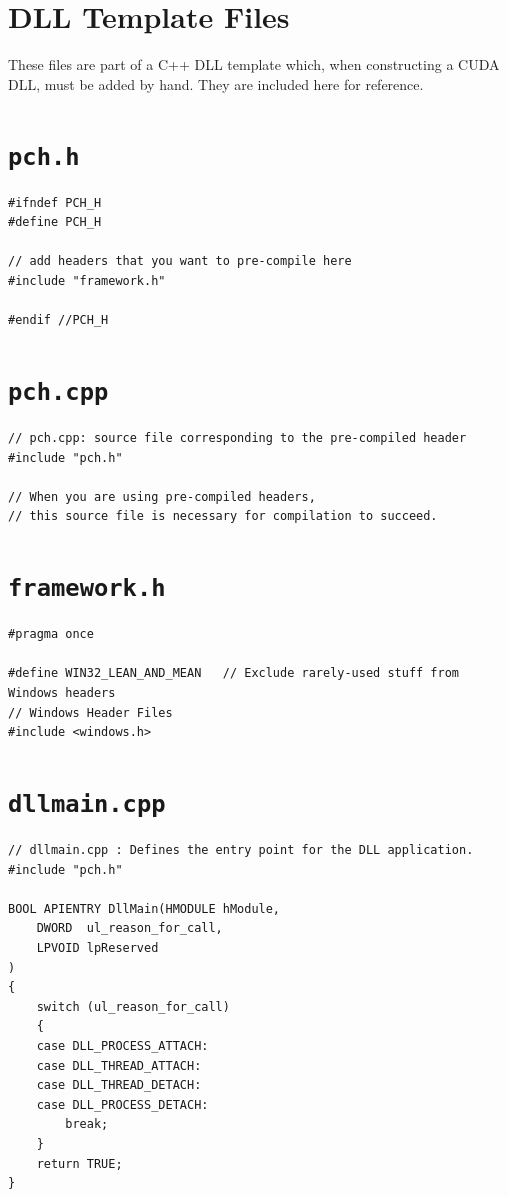 \documentclass[11pt,letterpaper]{article}
\begin{document}
\section{DLL Template Files}
\label{sec: dll template}
These files are part of a C++ DLL template which, when constructing a CUDA DLL, must be added by hand. They are included here for reference.


\section*{\texttt{pch.h}}
\begin{verbatim}
#ifndef PCH_H
#define PCH_H

// add headers that you want to pre-compile here
#include "framework.h"

#endif //PCH_H
\end{verbatim}
\section*{\texttt{pch.cpp}}
\begin{verbatim}
// pch.cpp: source file corresponding to the pre-compiled header
#include "pch.h"

// When you are using pre-compiled headers, 
// this source file is necessary for compilation to succeed.
\end{verbatim}
\section*{\texttt{framework.h}}
\begin{verbatim}
#pragma once

#define WIN32_LEAN_AND_MEAN   // Exclude rarely-used stuff from Windows headers
// Windows Header Files
#include <windows.h>
\end{verbatim}
\section*{\texttt{dllmain.cpp}}
\begin{verbatim}
// dllmain.cpp : Defines the entry point for the DLL application.
#include "pch.h"

BOOL APIENTRY DllMain(HMODULE hModule,
    DWORD  ul_reason_for_call,
    LPVOID lpReserved
)
{
    switch (ul_reason_for_call)
    {
    case DLL_PROCESS_ATTACH:
    case DLL_THREAD_ATTACH:
    case DLL_THREAD_DETACH:
    case DLL_PROCESS_DETACH:
        break;
    }
    return TRUE;
}
\end{verbatim}

\end{document}
